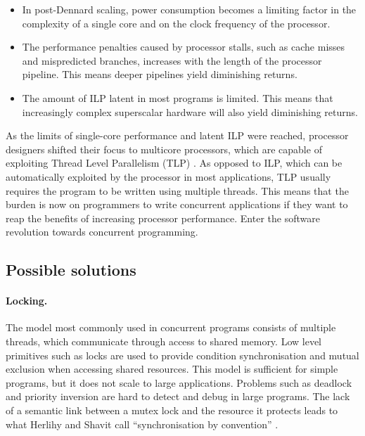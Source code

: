 \documentclass[12pt,a4paper,oneside,openright]{report}
\begin{document}
\begin{itemize}
\item In post-Dennard scaling, power consumption becomes a limiting
  factor in the complexity of a single core and on the clock frequency
  of the processor.
  
\item The performance penalties caused by processor stalls, such as
  cache misses and mispredicted branches, increases with the length of
  the processor pipeline. This means deeper pipelines yield
  diminishing returns.
  
\item The amount of ILP latent in most programs is limited. This means
  that increasingly complex superscalar hardware will also yield
  diminishing returns.
\end{itemize}
As the limits of single-core performance and latent ILP were reached,
processor designers shifted their focus to multicore processors, which
are capable of exploiting Thread Level Parallelism (TLP)
\cite[Chapter~5]{CompArchBook}. As opposed to ILP, which can be
automatically exploited by the processor in most applications, TLP
usually requires the program to be written using multiple
threads. This means that the burden is now on programmers to write
concurrent applications if they want to reap the benefits of
increasing processor performance. Enter the software revolution
towards concurrent programming.

\subsection{Possible solutions}
\label{sec:possible-solutions}

\paragraph{Locking.} The model most commonly used in concurrent
programs consists of multiple threads, which communicate through
access to shared memory. Low level primitives such as locks are used
to provide condition synchronisation and mutual exclusion when
accessing shared resources. This model is sufficient for simple
programs, but it does not scale to large applications. Problems such
as deadlock and priority inversion are hard to detect and debug in
large programs. The lack of a semantic link between a mutex lock and
the resource it protects leads to what Herlihy and Shavit call
``synchronisation by convention'' \cite[Chapter
18]{ArtMultiprocessorProgramming}.
\end{document}
